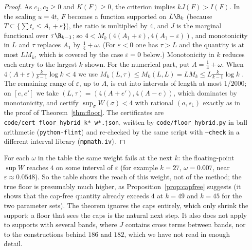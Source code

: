 \begin{proof}
As $c_1,c_2\ge0$ and $K(F)\ge0$, the criterion implies $kJ(F)>I(F)$. In the
scaling $u=4t$, $F$ becomes a function supported on $L\R_k$ (because
$T\subseteq\{\sum t_i\le A_1+\varepsilon\}$), the ratio is multiplied by $4$,
and $J$ is the marginal functional over $\tau\R_{k-1}$; so
$4<M_k(4(A_1+\varepsilon),4(A_1-\varepsilon))$, and monotonicity in $L$ and
$\tau$ replaces $A_1$ by $\frac14+\omega$. (For $\varepsilon<0$ one has
$\tau>L$ and the quantity is at most $LM_k$, which is covered by the case
$\varepsilon=0$ below.) Monotonicity in $k$ reduces each entry to the largest
$k$ shown. For the numerical part, put $A=\frac14+\omega$. When
$4(A+\varepsilon)\frac{k}{k-1}\log k<4$ we use
$M_k(L,\tau)\le M_k(L,L)=LM_k\le L\frac{k}{k-1}\log k$
\cite[Cor.~6.4]{Pol14b}. The remaining range of $\varepsilon$, up to $A$, is
cut into intervals of length at most $1/2000$; on $[e,e']$ we take
$(L,\tau)=(4(A+e'),4(A-e))$, which dominates by monotonicity, and certify
$\sup_\sigma W(\sigma)<4$ with rational $(a,s_1)$ exactly as in the proof of
Theorem~\ref{thm:floor}. The certificates are
\texttt{code/cert\_floor\_hybrid\_k*\_w*.json}, written by
\texttt{code/floor\_hybrid.py} in ball arithmetic (\texttt{python-flint}) and
re-checked by the same script with \texttt{--check} in a different interval
library (\texttt{mpmath.iv}).
\end{proof}

\begin{remark}
For each $\omega$ in the table the same weight fails at the next $k$: the
floating-point $\sup W$ reaches $4$ on some interval of $\varepsilon$ (for
example $k=27$, $\omega=0.007$, near $\varepsilon\approx0.0548$). So the table
shows the reach of this weight, not of the method; the true floor is
presumably much higher, as Proposition~\ref{prop:capfree} suggests (it shows
that the cap-free quantity already exceeds $4$ at $k=49$ and $k=45$ for the two
parameter sets). The theorem ignores the caps entirely, which only shrink the
support; a floor that sees the caps is the natural next step. It also does not
apply to supports with several bands, where $J$ contains cross terms between
bands, nor to the constructions behind $186$ and $182$, which we have not
read in enough detail.
\end{remark}

